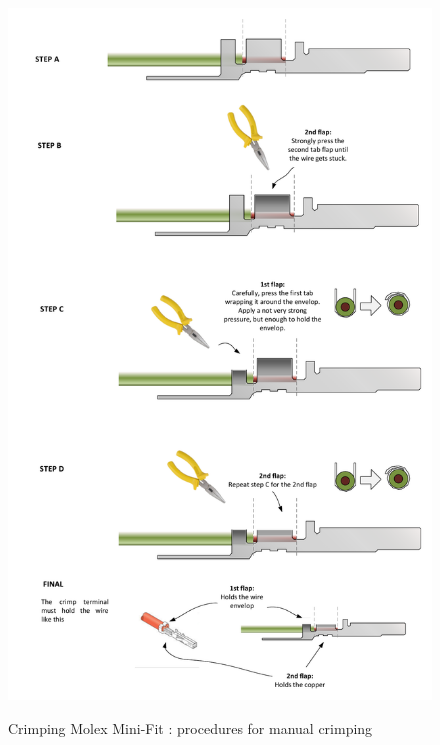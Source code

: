 \begin{figure}
  \centering
  \includegraphics[angle=90,width=1\columnwidth]{figs/body03/FIGCRIMP6.pdf}\\
  \caption[Crimping Molex Mini-Fit \textregistered: procedures for manual crimping]{Crimping Molex Mini-Fit \textregistered: procedures for manual crimping}
  \label{FIG:CRIMP6}
\end{figure}
